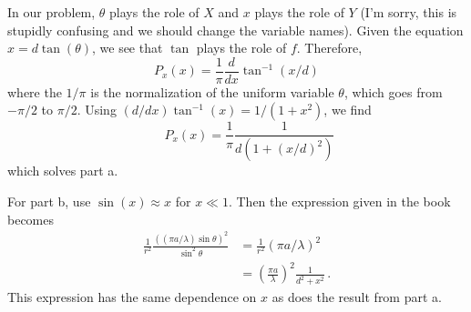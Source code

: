 In our problem, $\theta$ plays the role of $X$ and $x$ plays the role of $Y$ (I'm sorry, this is stupidly confusing and we should change the variable names).
Given the equation $x = d \tan(\theta)$, we see that $\tan$ plays the role of $f$.
Therefore,
\begin{equation*}
  P_x(x) = \frac{1}{\pi} \frac{d}{dx} \tan^{-1}(x/d)
\end{equation*}
where the $1/\pi$ is the normalization of the uniform variable $\theta$, which goes from $-\pi/2$ to $\pi/2$.
Using $(d/dx)\tan^{-1}(x) = 1/(1 + x^2)$, we find
\begin{equation*}
  \qquad P_x(x) = \frac{1}{\pi} \frac{1}{d \left( 1 + (x/d)^2 \right)}
\end{equation*}
which solves part a.

For part b, use $\sin(x) \approx x$ for $x \ll 1$.
Then the expression given in the book becomes
\begin{align*}
  \frac{1}{r^2} \frac{((\pi a / \lambda) \sin \theta)^2}{\sin^2 \theta}
  &= \frac{1}{r^2} (\pi a / \lambda)^2 \\
  &= \left( \frac{\pi a}{\lambda} \right)^2 \frac{1}{d^2 + x^2} \, .
\end{align*}
This expression has the same dependence on $x$ as does the result from part a.
